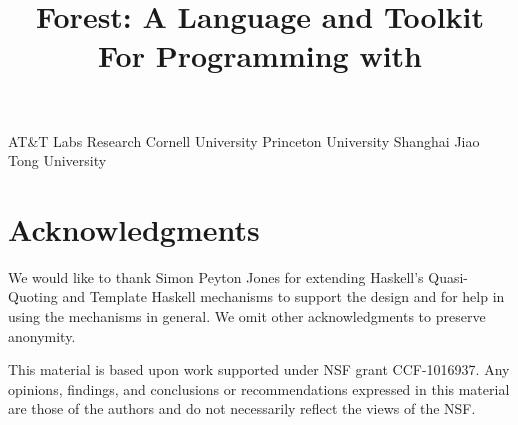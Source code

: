 \documentclass[nocopyrightspace,natbib,preprint]{sigplanconf}
\newif\ifanon\anonfalse  %
\begin{document}


\copyrightdata{} 

\title{Forest: A Language and Toolkit For Programming with \Filestores{}}

\ifanon
\authorinfo{\vskip -2in}
 	   {\vskip -2in}
           {}
\else
{}
	   {AT\&T Labs Research}{}
           {Cornell University}{}
           {Princeton University}{}
           {Shanghai Jiao Tong University}{}
\fi

\maketitle{}

\begin{abstract}  

\end{abstract}













\ifanon
\else
\section*{Acknowledgments}
We would like to thank Simon Peyton Jones for extending Haskell's
Quasi-Quoting and Template Haskell mechanisms to support the \forest{}
design and for help in using the mechanisms in general. We omit other
acknowledgments to preserve anonymity.

This material is based upon work supported under NSF grant
CCF-1016937.  Any opinions, findings, and conclusions or
recommendations expressed in this material are those of the authors
and do not necessarily reflect the views of the NSF.
\fi





\ifanon
\else
\onecolumn
\newpage
\appendix

\fi
\end{document}
